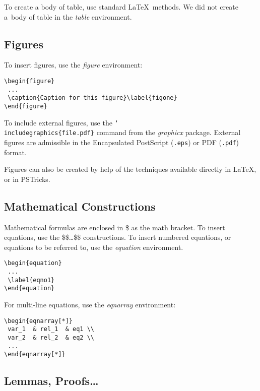 \documentclass{cai}
\def\bs#1{{\tt\char`\\#1}}
\begin{document}
To create a body of table, use standard \LaTeX\ methods. We did not create a~body of table in the
\textit{table} environment.

\subsection{Figures}

To insert figures, use the \textit{figure} environment:

\begin{verbatim}
\begin{figure}
 ...
 \caption{Caption for this figure}\label{figone}
\end{figure}
\end{verbatim}

To include external figures, use the \bs{includegraphics\{file.pdf\}} command from the \textit{graphicx}
package. External figures are admissible in the Encapsulated Post\-Script (\texttt{.eps}) or PDF (\texttt{.pdf}) format.

Figures can also be created by help of the techniques available directly in \LaTeX, or in PSTricks.

\subsection{Mathematical Constructions}

Mathematical formulas are enclosed in \$ as the math bracket. To insert equations, use the \$\$\dots\$\$
constructions. To insert numbered equations, or equations to be referred to, use the \textit{equation}
environment.
\begin{verbatim}
\begin{equation}
 ...
 \label{eqno1}
\end{equation}
\end{verbatim}
For multi-line equations, use the \textit{eqnarray} environment:
\begin{verbatim}
\begin{eqnarray[*]}
 var_1  & rel_1  & eq1 \\
 var_2  & rel_2  & eq2 \\
 ...
\end{eqnarray[*]}
\end{verbatim}

\subsection{Lemmas, Proofs\dots}
\end{document}
